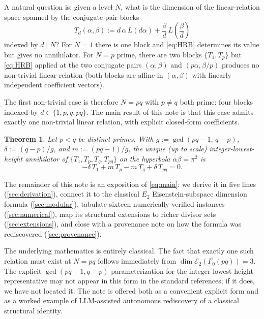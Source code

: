 \documentclass[11pt,reqno]{amsart}
\newtheorem{theorem}{Theorem}[section]
\theoremstyle{definition}
\newcommand{\Eis}{\mathcal{E}}
\begin{document}
A natural question is: given a level $N$, what is the dimension of the
linear-relation space spanned by the conjugate-pair blocks
\begin{equation}\label{eq:Td}
T_d(\alpha,\beta) := d\,\alpha\,L(d\alpha)
+ \frac{\beta}{d}\,L\!\left(\frac{\beta}{d}\right)
\end{equation}
indexed by $d \mid N$? For $N = 1$ there is one block and
\cref{eq:HRB} determines its value but gives no annihilator. For
$N = p$ prime, there are two blocks $\{T_1, T_p\}$ but
\cref{eq:HRB} applied at the two conjugate pairs $(\alpha,\beta)$ and
$(p\alpha, \beta/p)$ produces no non-trivial linear relation (both
blocks are affine in $(\alpha,\beta)$ with linearly independent
coefficient vectors).

The first non-trivial case is therefore $N = pq$ with $p \ne q$ both
prime: four blocks indexed by $d \in \{1, p, q, pq\}$. The main result
of this note is that this case admits exactly one non-trivial linear
relation, with explicit closed-form coefficients.

\begin{theorem}\label{thm:main}
Let $p < q$ be distinct primes. With $g := \gcd(pq-1,\, q-p)$,
$\delta := (q-p)/g$, and $m := (pq-1)/g$, the unique (up to scale)
integer-lowest-height annihilator of $\{T_1, T_p, T_q, T_{pq}\}$ on the
hyperbola $\alpha\beta = \pi^2$ is
\begin{equation}\label{eq:main}
-\delta\, T_1 + m\, T_p - m\, T_q + \delta\, T_{pq} = 0.
\end{equation}
\end{theorem}

The remainder of this note is an exposition of \cref{eq:main}: we
derive it in five lines (\cref{sec:derivation}), connect it to the
classical $E_2$ Eisenstein-subspace dimension formula
(\cref{sec:modular}), tabulate sixteen numerically verified instances
(\cref{sec:numerical}), map its structural extensions to richer
divisor sets (\cref{sec:extensions}), and close with a provenance note
on how the formula was rediscovered (\cref{sec:provenance}).

The underlying mathematics is entirely classical. The fact that
exactly one such relation must exist at $N = pq$ follows immediately
from $\dim \Eis_2(\Gamma_0(pq)) = 3$. The explicit
$\gcd(pq-1, q-p)$ parameterization for the integer-lowest-height
representative may not appear in this form in the standard
references; if it does, we have not located it. The note is offered
both as a convenient explicit form and as a worked example of
LLM-assisted autonomous rediscovery of a classical structural
identity.
\end{document}
